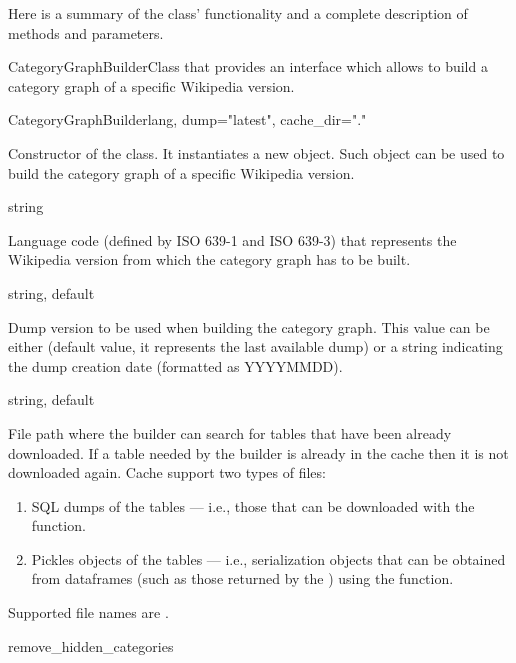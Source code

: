             Here is a summary of the class' functionality and a complete description of methods and parameters.
            \begin{classdoc}{CategoryGraphBuilder}{Class that provides an interface which allows to build a category graph of a specific Wikipedia version.}
                \item \begin{classmethod}{CategoryGraphBuilder}{lang, dump="latest", cache\_dir="."}
                
                    \begin{functiondescription}
                        Constructor of the class. It instantiates a new  object. Such object can be used to build the category graph of a specific Wikipedia version.
                    \end{functiondescription}
                    
                    \begin{functionparameters}
                        \item[lang] string
                        
                        Language code (defined by ISO 639-1 and ISO 639-3) that represents the Wikipedia version from which the category graph has to be built.
                        \item[dump] string, default 

                        Dump version to be used when building the category graph. This value can be either  (default value, it represents the last available dump) or a string indicating the dump creation date (formatted as YYYYMMDD).
                        \item[cache\_dir] string, default 
                    
                        File path where the builder can search for tables that have been already downloaded. If a table needed by the builder is already in the cache then it is not downloaded again. Cache support two types of files:
                        \begin{enumerate}
                            \item SQL dumps of the tables --- i.e., those that can be downloaded with the  function.
                            \item Pickles objects of the tables --- i.e., serialization objects that can be obtained from dataframes (such as those returned by the ) using the  function.
                        \end{enumerate}
                        Supported file names are .
                    \end{functionparameters}
                \end{classmethod}
                \item \begin{classmethod}{remove\_hidden\_categories}{}
                

\end{classmethod}
\end{classdoc}
